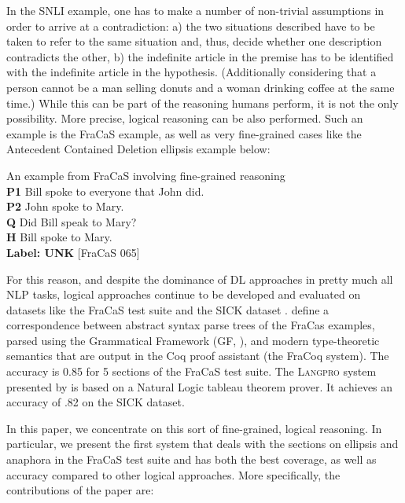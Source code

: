 \documentclass[11pt]{article}
\begin{document}
%
In the SNLI example, one has to make a number of non-trivial
assumptions in order to arrive at a contradiction: a) the two
situations described have to be taken to refer to the same situation
and, thus, decide whether one description contradicts the other, b)
the indefinite article in the premise has to be identified with the
indefinite article in the hypothesis. (Additionally considering that a
person cannot be a man selling donuts and a woman drinking coffee at
the same time.) While this can be part of the reasoning humans
perform, it is not the only possibility. More precise, logical
reasoning can be also performed. Such an example is the FraCaS
example, as well as very fine-grained cases like the Antecedent
Contained Deletion ellipsis example below:

\begin{lingex}

\item An example from FraCaS involving fine-grained reasoning\\
\textbf{P1}	Bill spoke to everyone that John did.	\\	
\textbf{P2}	John spoke to Mary.	\\
\textbf{Q} 	Did Bill speak to Mary?\\
\textbf{H} 	Bill spoke to Mary.\\
\textbf{Label:	UNK} [FraCaS 065] 	\end{lingex}




For this reason, and despite the dominance of DL approaches in pretty
much all NLP tasks, logical approaches continue to be
developed and evaluated on datasets like the FraCaS test suite and the
SICK dataset \cite{marelli:2014}.  \citet{bernardy:2017} define a
correspondence between abstract syntax parse trees of the FraCas
examples, parsed using the Grammatical Framework (GF,
\citet{Ranta:GF}), and modern type-theoretic semantics that are output
in the Coq proof assistant (the FraCoq system).  The accuracy is 0.85
for 5 sections of the FraCaS test suite. The \textsc{Langpro} system
presented by \citet{abzianidze:2017} is based on a Natural Logic
tableau theorem prover. It achieves an accuracy of .82 on the SICK
dataset.

In this paper, we concentrate on this sort of fine-grained, logical
reasoning. In particular, we present the first system that deals with
the sections on ellipsis and anaphora in the FraCaS test suite and has
both the best coverage, as well as accuracy compared to other logical
approaches. More specifically, the contributions of the paper are:
\end{document}
